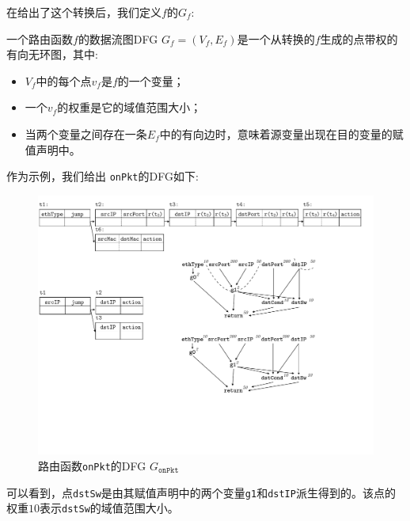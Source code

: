 在给出了这个转换后，我们定义$f$的$G_f$:

\begin{definition} 一个路由函数$f$的数据流图DFG $G_f = (V_f, E_f)$是一个从转换的$f$生成的点带权的有向无环图，其中:
\begin{itemize}
  \item $V_f$中的每个点$v_f$是$f$的一个变量；
  \item 一个$v_f$的权重是它的域值范围大小；
  \item 当两个变量之间存在一条$E_f$中的有向边时，意味着源变量出现在目的变量的赋值声明中。
\end{itemize}
\end{definition}

作为示例，我们给出 \texttt{onPkt}的DFG如下:
\begin{figure}[tbh]
    \centering
    \includegraphics[scale = 0.8]{figures/figure2.pdf}
    \caption{路由函数\texttt{onPkt}的DFG $G_{\texttt{onPkt}}$}
    \label{cap:fig:onpkt-dfg}
\end{figure}

可以看到，点\texttt{dstSw}是由其赋值声明中的两个变量\texttt{g1}和\texttt{dstIP}派生得到的。该点的权重$10$表示\texttt{dstSw}的域值范围大小。



